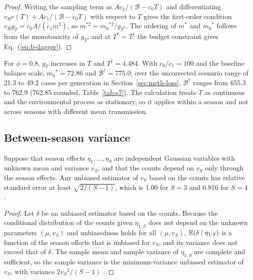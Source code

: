 \begin{proof}
Writing the sampling term as $Ac_1/(\mathcal{B}-c_0T)$ and differentiating $v_Re(T)+Ac_1/(\mathcal{B}-c_0T)$ with respect to $T$ gives the first-order condition $v_Rg_T=c_0A/(c_1m^2)$, so $m^{*2}=m_0{}^{*2}/g_{T^*}$. The ordering of $m^*$ and $m_0{}^*$ follows from the monotonicity of $g_T$, and at $T^*=T^\dagger$ the budget constraint gives Eq.~(\ref{eq:b-dagger}).
\end{proof}

For $\phi=0.8$, $g_T$ increases in $T$ and $T^\dagger=4.484$. With $c_0/c_1=100$ and the baseline balance scale, $m_0{}^*=72.86$ and $\mathcal{B}^\dagger=775.0$; over the uncorrected scenario range of 21.3 to 49.2 cases per generation in Section~\ref{sec:meth-loss}, $\mathcal{B}^\dagger$ ranges from 655.3 to 762.9 (762.85 rounded, Table~\ref{tab:s7}). The calculation treats $T$ as continuous and the environmental process as stationary, so it applies within a season and not across seasons with different mean transmission.

\subsection{Between-season variance}
\label{app:seasons}

\begin{corollary}
\label{cor:season}
Suppose that season effects $\eta_1,\dots,\eta_S$ are independent Gaussian variables with unknown mean and variance $v_S$, and that the counts depend on $v_S$ only through the season effects. Any unbiased estimator of $v_S$ based on the counts has relative standard error at least $\sqrt{2/(S-1)}$, which is 1.00 for $S=3$ and 0.816 for $S=4$.
\end{corollary}

\begin{proof}
Let $\delta$ be an unbiased estimator based on the counts. Because the conditional distribution of the counts given $\eta_{1:S}$ does not depend on the unknown parameters $(\mu, v_S)$ and unbiasedness holds for all $(\mu, v_S)$, $\mathbb{E}(\delta\mid\eta_{1:S})$ is a function of the season effects that is unbiased for $v_S$, and its variance does not exceed that of $\delta$. The sample mean and sample variance of $\eta_{1:S}$ are complete and sufficient, so the sample variance is the minimum-variance unbiased estimator of $v_S$, with variance $2v_S{}^2/(S-1)$ \citep{lehmann1998theory, lehmann2005testing, searle1992variance}.
\end{proof}


